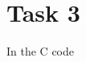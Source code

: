 \documentclass[headings=small,a4paper,12pt]{scrartcl}
\begin{document}
\section{Task 3}
\label{sec:task-3}



In the C code
\end{document}
